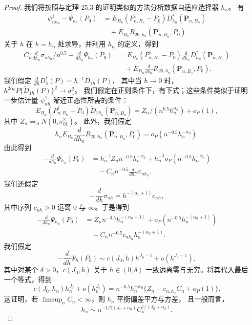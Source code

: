 \begin{proof}
我们将按照与定理 25.3 的证明类似的方法分析数据自适应选择器 $h_n$。
有
\[
\begin{aligned}
 \psi^1_{nh_n}-\Psi_{h_n}(P_0)
 &=E_{B_n}(P^1_{n,B_n}-P_0)D_{h_n}^*(\mathbf P_{n,B_n})\\
 &\quad+E_{B_n}R_{20,h_n}(\mathbf P_{n,B_n},P_0).
\end{aligned}
\]
关于 $h$ 在 $h=h_n$ 处求导，并利用 $h_n$ 的定义，得到
\[
\begin{aligned}
 C_n\frac{d}{dh_n}\sigma_{nh_n}/n^{0.5}
 -\frac{d}{dh_n}\Psi_{h_n}(P_0)
 &=E_{B_n}(P^1_{n,B_n}-P_0)
 \frac{d}{dh_n}D_{h_n}^*(\mathbf P_{n,B_n})\\
 &\quad+E_{B_n}\frac{d}{dh_n}
 R_{20,h_n}(\mathbf P_{n,B_n},P_0).
\end{aligned}
\]
我们假定 $\frac{d}{dh}D_h^*(P)=h^{-1}\tilde D_{1h}(P)$，
其中当 $h\to0$ 时，
$h^{2\alpha_0}P\{\tilde D_{1h}(P)\}^2\to\sigma_1^2$。
我们假定在正则条件下，有下式；这些条件类似于证明一步估计量
$\psi^1_{nh}$ 渐近正态性所需的条件：
\[
 E_{B_n}(P^1_{n,B_n}-P_0)\tilde D_{1h_n}(\mathbf P_{n,B_n})
 =Z_n/(n^{0.5}h_n^{\alpha_0})+o_P(1),
\]
其中 $Z_n\Rightarrow_dN(0,\sigma_{01}^2)$。
此外，我们假定
\[
 h_nE_{B_n}\frac{d}{dh_n}R_{20,h_n}(\mathbf P_{n,B_n},P_0)
 =o_P(n^{-0.5}h_n^{-\alpha_0}).
\]
由此得到
\[
\begin{aligned}
 -\frac{d}{dh_n}\Psi_{h_n}(P_0)
 &=h_n^{-1}Z_nn^{-0.5}h_n^{-\alpha_0}
 +h_n^{-1}o_P(n^{-0.5}h_n^{-\alpha_0})\\
 &\quad-C_nn^{-0.5}\frac{d}{dh_n}\sigma_{nh_n}.
\end{aligned}
\]
我们还假定
\[
 -\frac{d}{dh}\sigma_{nh}=h^{-(\alpha_0+1)}c_{nh},
\]
其中序列 $c_{nh}>0$ 远离 0 与 $\infty$。于是得到
\[
\begin{aligned}
 -\frac{d}{dh_n}\Psi_{h_n}(P_0)
 &=Z_nn^{-0.5}h_n^{-(\alpha_0+1)}
 +o_P(n^{-0.5}h_n^{-(\alpha_0+1)})\\
 &\quad-C_nn^{-0.5}c_{nh_n}h_n^{-(\alpha_0+1)}.
\end{aligned}
\]
我们假定
\[
 -\frac{d}{dh}\Psi_h(P_0)
 \sim c(J_0,h)h^{J_0-1}+o(h^{J_0-1}),
\]
其中对某个 $\delta>0$，$c(J_0,h)$ 关于 $h\in(0,\delta)$
一致远离零与无穷。将其代入最后一个等式，得到
\[
 c(J_0,h_n)h_n^{J_0}+o(h_n^{J_0})
 =n^{-0.5}h_n^{-\alpha_0}
 \{Z_n-c_{n,h_n}C_n+o_P(1)\}.
\]
这证明，若 $\limsup_nC_n<\infty$，则 $h_n$ 平衡偏差平方与方差，
且一般而言，
\[
 h_n\sim n^{-1/2(J_0+\alpha_0)}C_n^{1/(J_0+\alpha_0)}.
\]
\end{proof}
